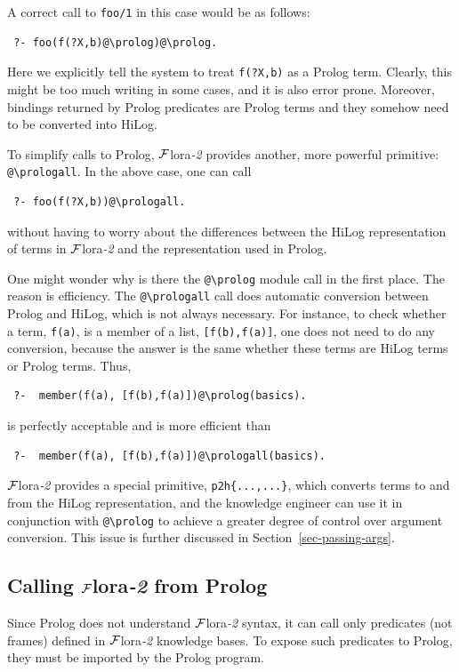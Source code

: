 \documentclass[11pt]{article}
\newcommand{\FLORA}{{\mbox{\sc ${\cal F}${lora}\rm\emph{-2}}}\xspace}
\newcommand{\FLSYSTEM}{\FLORA}
\newcommand{\bs}{\textbackslash}
\begin{document}
A correct call to {\tt foo/1} in this case would be as follows:
\begin{verbatim}
 ?- foo(f(?X,b)@\prolog)@\prolog.
\end{verbatim}
Here we explicitly tell the system to treat {\tt f(?X,b)} as a Prolog term. 
Clearly, this might be too much writing in some cases,
and it is also error prone. Moreover, bindings returned by Prolog
predicates are Prolog terms and they somehow need to be converted into
HiLog.

To simplify calls to Prolog, \FLSYSTEM provides another, more powerful
primitive: {\tt @\bs{}prologall}. In the above case, one can call
\begin{verbatim}
 ?- foo(f(?X,b))@\prologall.  
\end{verbatim}
without having to worry about the differences between the HiLog
representation of terms in \FLSYSTEM and the representation used in Prolog.

One might wonder why is there the {\tt @\bs{}prolog} module call in the first
place. The reason is efficiency. The {\tt @\bs{}prologall} call does automatic
conversion between Prolog and HiLog, which is not always necessary. For
instance, to check whether a term, {\tt f(a)}, is a member of a list,
{\tt [f(b),f(a)]}, one does not need to do any conversion, because the
answer is the same whether these terms are HiLog terms or Prolog
terms. Thus,
\begin{verbatim}
 ?-  member(f(a), [f(b),f(a)])@\prolog(basics).
\end{verbatim}
is perfectly acceptable and is more efficient than
\begin{verbatim}
 ?-  member(f(a), [f(b),f(a)])@\prologall(basics).
\end{verbatim}
\FLSYSTEM provides a special primitive, {\tt p2h\{...,...\}}, which converts terms to
and from the HiLog representation, and the knowledge engineer can use it in
conjunction with {\tt @\bs{}prolog} to achieve a greater degree of control
over argument conversion. This issue is further discussed in
Section~\ref{sec-passing-args}.



\subsection{Calling \FLSYSTEM from Prolog}\label{sec-flora-from-prolog}

Since Prolog does not understand \FLSYSTEM syntax, it can call only
predicates (not frames) defined in \FLSYSTEM knowledge bases. To expose such
predicates to Prolog,
they must be imported by the Prolog program.
\end{document}
